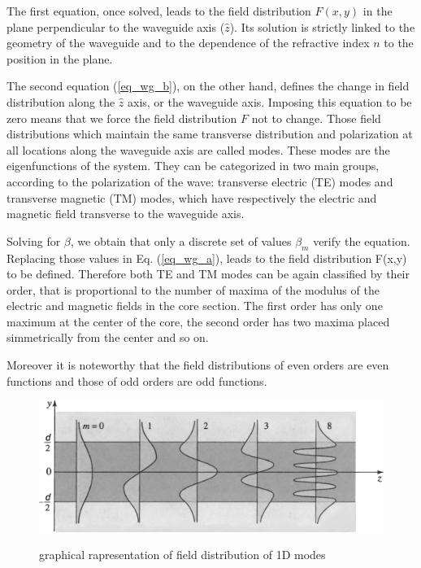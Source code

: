 \documentclass[12pt,a4paper,twoside]{article}
\begin{document}
The first equation, once solved, leads to the field distribution $F(x,y)$ in the plane perpendicular to the waveguide axis ($\hat{z}$).
Its solution is strictly linked to the geometry of the waveguide and to the dependence of the refractive index $n$ to the position in the plane.

The second equation (\ref{eq_wg_b}), on the other hand, defines the change in field distribution along the $\hat{z}$ axis, or the waveguide axis.
Imposing this equation to be zero means that we force the field distribution $F$ not to change.
Those field distributions which maintain the same transverse distribution and polarization at all locations along the waveguide axis are called modes.
These modes are the eigenfunctions of the system.
They can be categorized in two main groups, according to the polarization of the wave: transverse electric (TE) modes and transverse magnetic (TM) modes, which have respectively the electric and magnetic field transverse to the waveguide axis.

Solving for $\beta$, we obtain that only a discrete set of values $\beta_m$ verify the equation.
Replacing those values in Eq. (\ref{eq_wg_a}), leads to the field distribution F(x,y) to be defined.
Therefore both TE and TM modes can be again classified by their order, that is proportional to the number of maxima of the modulus of the electric and magnetic fields in the core section.
The first order has only one maximum at the center of the core, the second order has two maxima placed simmetrically from the center and so on.

Moreover it is noteworthy that the field distributions of even orders are even functions and those of odd orders are odd functions.

\begin{figure}[ht]
	\centering
	\includegraphics[width=.75\textwidth]{1D_fields.png}
	\label{fig_1dmodes}
	\caption{graphical rapresentation of field distribution of 1D modes}
\end{figure}
\end{document}
